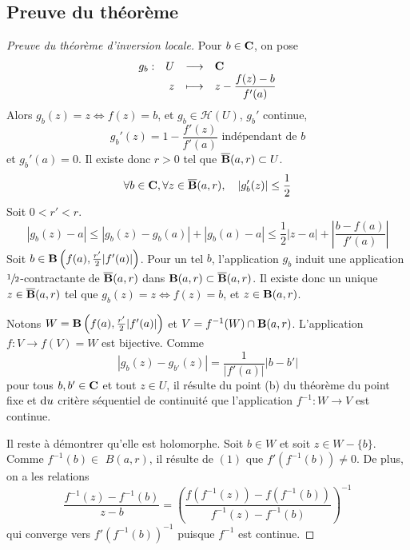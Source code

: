 \subsection{Preuve du théorème}

\begin{proof}[Preuve du théorème d'inversion locale]
Pour $b \in  \mathbf C$, on pose \[
\begin{array}{rrcl}
    g_b:& U & \longrightarrow & \mathbf C \\
        & z & \longmapsto & \displaystyle z- \frac{f(z)-b}{f'(a)}
\end{array}
\] 
Alors $g_b(z)=z \iff  f(z)=b$, et $g_b \in  \mathcal  H(U)$, $g_b'$ continue,  \[
    g_b'(z)=1-\frac{f'(z)}{f'(a)} \text{ indépendant de }b
\]
et $g_b'(a)=0$. Il existe donc $r>0$ tel que  $\overline{\mathbf B}(a, r)\subset U$. \[
    \forall  b \in  \mathbf C, \forall  z \in  \overline{\mathbf B}(a, r), \quad  |g_b'(z)|\leq \frac{1}{2}
\] 
Soit $0<r'<r$.  \[
    |g_b(z)-a|\leq |g_b(z)-g_b(a)|+|g_b(a)-a|\leq \frac{1}{2} |z-a|+ \left| \frac{b-f(a)}{f'(a)} \right|
\] 
Soit $b \in  \mathbf B \left(f(a), \frac{r'}2 |f'(a)|\right)$. Pour un tel $b$, l'application  $g_b$ induit une application $\sfrac{1}{2}$-contractante  de $\overline{\mathbf B}(a, r)$ dans $\mathbf B(a, r)\subset \overline{\mathbf B}(a, r)$.
Il existe donc un unique $z \in  \overline{\mathbf B}(a, r)$ tel que $g_b(z)=z \iff  f(z)=b$, et $z \in  \mathbf B(a, r)$.


Notons $W=\mathbf B \left(f(a), \frac{r'}2 |f'(a)|\right)$ et  $V=f^{-1}(W)\cap \mathbf B(a, r)$. L'application $f:V\longrightarrow f(V)=W$ est bijective. 
Comme
\[
\left|g_{b}(z)-g_{b'}(z)\right|=\frac{1}{\left|f'(a)\right|}\left|b-b'\right|
\]
pour tous $b, b' \in \mathbf C$ et tout $z \in U$, il résulte du point (b) du théorème du point fixe et $\mathop{}\!\mathrm d u$ critère séquentiel de continuité que l'application $f^{-1}: W \rightarrow V$ est continue.

Il reste à démontrer qu'elle est holomorphe. Soit $b \in W$ et soit $z \in W-\{b\} .$ Comme $f^{-1}(b) \in$ $B(a, r)$, il résulte de $(1)$ que $f'\left(f^{-1}(b)\right) \neq 0 .$ De plus, on a les relations
\[
\frac{f^{-1}(z)-f^{-1}(b)}{z-b}=\left(\frac{f\left(f^{-1}(z)\right)-f\left(f^{-1}(b)\right)}{f^{-1}(z)-f^{-1}(b)}\right)^{-1}
\]
qui converge vers $f'\left(f^{-1}(b)\right)^{-1}$ puisque $f^{-1}$ est continue.

\end{proof}
